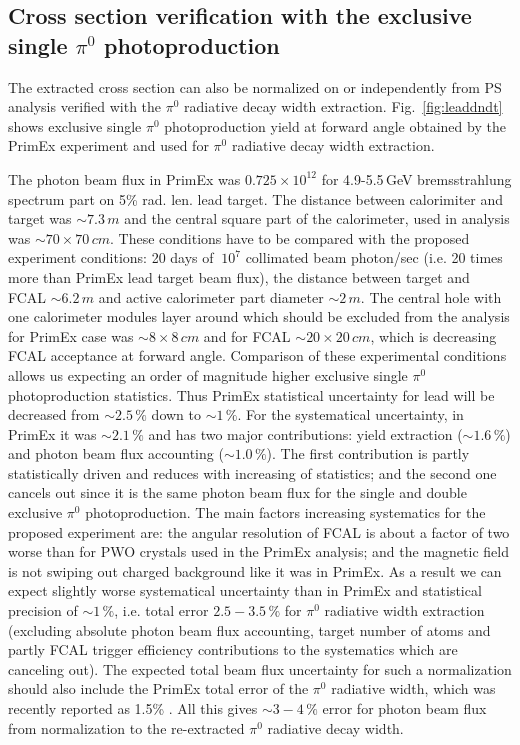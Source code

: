 \subsection{Cross section verification with the exclusive single $\pi^{0}$ photoproduction  \label{sec:pi0norm} }
The extracted cross section can also be normalized on or independently
from PS analysis verified with the $\pi^0$ radiative decay width
extraction.  Fig.~\ref{fig:leaddndt} shows exclusive single $\pi^0$
photoproduction yield at forward angle obtained by the PrimEx
experiment and used for $\pi^0$ radiative decay width extraction.

The photon beam flux in PrimEx was $0.725\times10^{12}$ for
4.9-5.5$\,$GeV bremsstrahlung spectrum part on 5\% rad. len. lead
target. The distance between calorimiter and target was $\sim7.3\,m$
and the central square part of the calorimeter, used in analysis was
$\sim70\times70\,cm$. These conditions have to be compared with the
proposed experiment conditions: 20 days of $~10^7$ collimated beam
photon/sec (i.e. 20 times more than PrimEx lead target beam flux), the
distance between target and FCAL $\sim6.2\,m$ and active calorimeter
part diameter $\sim2\,m$.  The central hole with one calorimeter
modules layer around which should be excluded from the analysis for
PrimEx case was $\sim8\times8\,cm$ and for FCAL $\sim20\times20\,cm$,
which is decreasing FCAL acceptance at forward angle. Comparison of
these experimental conditions allows us expecting an order of
magnitude higher exclusive single $\pi^0$ photoproduction statistics.
Thus PrimEx statistical uncertainty for lead will be decreased from
$\sim2.5\,\%$ down to $\sim1\,\%$.  For the systematical uncertainty,
in PrimEx it was $\sim2.1\,\%$ and has two major contributions: yield
extraction ($\sim1.6\,\%$) and photon beam flux accounting
($\sim1.0\,\%$).  The first contribution is partly statistically
driven and reduces with increasing of statistics; and the second one
cancels out since it is the same photon beam flux for the single and
double exclusive $\pi^0$ photoproduction.  The main factors increasing
systematics for the proposed experiment are: the angular resolution of
FCAL is about a factor of two worse than for PWO crystals used in the
PrimEx analysis;
and the magnetic field is not swiping out charged background like it
was in PrimEx.  As a result we can expect slightly worse systematical
uncertainty than in PrimEx and statistical precision of $\sim1\,\%$,
i.e. total error $2.5-3.5\,\%$ for $\pi^0$ radiative width extraction
(excluding absolute photon beam flux accounting, target number of
atoms and partly FCAL trigger efficiency contributions to the
systematics which are canceling out).  The expected total beam flux
uncertainty for such a normalization should also include the PrimEx
total error of the $\pi^0$ radiative width, which was recently
reported as 1.5\% \cite{Larin:2018}.  All this gives $\sim3-4\,\%$
error for photon beam flux from normalization to the re-extracted $\pi^0$ radiative decay width.

